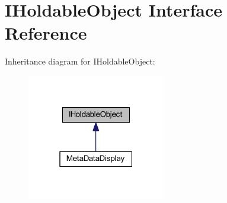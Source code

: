 \hypertarget{interface_i_holdable_object}{}\section{I\+Holdable\+Object Interface Reference}
\label{interface_i_holdable_object}


Inheritance diagram for I\+Holdable\+Object\+:
\nopagebreak
\begin{figure}[H]
\begin{center}
\leavevmode
\includegraphics[width=171pt]{interface_i_holdable_object__inherit__graph}
\end{center}
\end{figure}
